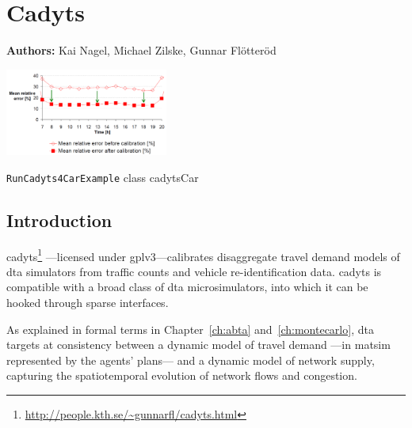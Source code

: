 \chapter{Cadyts}
\label{ch:cadyts}

\hfill \textbf{Authors:} Kai Nagel, Michael Zilske, Gunnar Fl\"otter\"od

\begin{center} \includegraphics[width=0.4\textwidth, angle=0]{extending/figures/cadyts/cadyts} \end{center}

{\lstinline{RunCadyts4CarExample} class}
{cadytsCar}
{\citet[][]{cadyts-manual, floetteroed-2010e, FloetteroedChenEtAl2011BehavioralCalibAndAnaNETS, Floetteroed2008PhD, Moyo2013PhD}}



\section{Introduction}

\gls{cadyts}\footnote{\url{http://people.kth.se/~gunnarfl/cadyts.html}}
---licensed under \gls{gplv3}---calibrates disaggregate travel demand models 
of \gls{dta} simulators from traffic counts and vehicle re-identification data. 
\gls{cadyts} is compatible with a broad class of \gls{dta} microsimulators,
into which it can be hooked through sparse interfaces.

As explained in formal terms in Chapter~\ref{ch:abta} and~\ref{ch:montecarlo}, 
\gls{dta} targets at consistency between a dynamic model of travel demand
---in \gls{matsim} represented by the agents' plans---
and a dynamic model of network supply, capturing the spatiotemporal
evolution of network flows and congestion.

